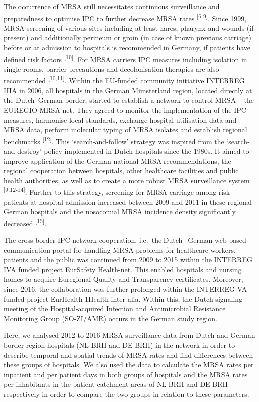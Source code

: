 \documentclass[
]{book}
\begin{document}
The occurrence of MRSA still necessitates continuous surveillance and preparedness to optimise IPC to further decrease MRSA rates \textsuperscript{{[}6-9{]}}. Since 1999, MRSA screening of various sites including at least nares, pharynx and wounds (if present) and additionally perineum or groin (in case of known previous carriage) before or at admission to hospitals is recommended in Germany, if patients have defined risk factors \textsuperscript{{[}10{]}}. For MRSA carriers IPC measures including isolation in single rooms, barrier precautions and decolonisation therapies are also recommended \textsuperscript{{[}10,11{]}}. Within the EU-funded community initiative INTERREG IIIA in 2006, all hospitals in the German Münsterland region, located directly at the Dutch--German border, started to establish a network to control MRSA -- the EUREGIO MRSA net. They agreed to monitor the implementation of the IPC measures, harmonise local standards, exchange hospital utilisation data and MRSA data, perform molecular typing of MRSA isolates and establish regional benchmarks \textsuperscript{{[}12{]}}. This `search-and-follow' strategy was inspired from the `search-and-destroy' policy implemented in Dutch hospitals since the 1980s. It aimed to improve application of the German national MRSA recommendations, the regional cooperation between hospitals, other healthcare facilities and public health authorities, as well as to create a more robust MRSA surveillance system \textsuperscript{{[}9,12-14{]}}. Further to this strategy, screening for MRSA carriage among risk patients at hospital admission increased between 2009 and 2011 in these regional German hospitals and the nosocomial MRSA incidence density significantly decreased \textsuperscript{{[}15{]}}.

The cross-border IPC network cooperation, i.e.~the Dutch−German web-based communication portal for handling MRSA problems for healthcare workers, patients and the public was continued from 2009 to 2015 within the INTERREG IVA funded project EurSafety Health-net. This enabled hospitals and nursing homes to acquire Euregional Quality and Transparency certificates. Moreover, since 2016, the collaboration was further prolonged within the INTERREG VA funded project EurHealth-1Health inter alia. Within this, the Dutch signaling meeting of the Hospital-acquired Infection and Antimicrobial Resistance Monitoring Group (SO-ZI/AMR) occurs in the German study region.

Here, we analysed 2012 to 2016 MRSA surveillance data from Dutch and German border region hospitals (NL-BRH and DE-BRH) in the network in order to describe temporal and spatial trends of MRSA rates and find differences between these groups of hospitals. We also used the data to calculate the MRSA rates per inpatient and per patient days in both groups of hospitals and the MRSA rates per inhabitants in the patient catchment areas of NL-BRH and DE-BRH respectively in order to compare the two groups in relation to these parameters.
\end{document}
